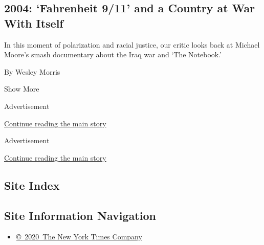 \begin{enumerate}
  \hypertarget{2004-fahrenheit-911-and-a-country-at-war-with-itself}{%
  \subsection{2004: `Fahrenheit 9/11' and a Country at War With
  Itself}\label{2004-fahrenheit-911-and-a-country-at-war-with-itself}}

  In this moment of polarization and racial justice, our critic looks
  back at Michael Moore's smash documentary about the Iraq war and `The
  Notebook.'

  By Wesley Morris
\end{enumerate}

Show More

Advertisement

\protect\hyperlink{after-mid1}{Continue reading the main story}

Advertisement

\protect\hyperlink{after-mktg}{Continue reading the main story}

\hypertarget{site-index}{%
\subsection{Site Index}\label{site-index}}

\hypertarget{site-information-navigation}{%
\subsection{Site Information
Navigation}\label{site-information-navigation}}

\begin{itemize}
\tightlist
\item
  \href{https://help.nytimes3xbfgragh.onion/hc/en-us/articles/115014792127-Copyright-notice}{©~2020~The
  New York Times Company}
\end{itemize}

